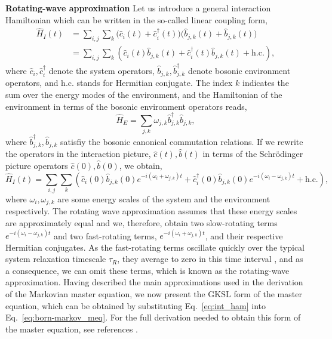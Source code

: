 \textbf{Rotating-wave approximation}
Let us introduce a general interaction Hamiltonian which can be written in the so-called linear coupling form, 
\begin{align}
    \hat{H}_I(t) &=  \sum_{i,j} \sum_{k}  \Big(\hat{c}_i(t) + \hat{c}^\dagger_i(t)\Big) \Big(\hat{b}_{j,k}(t) + \hat{b}_{j,k}(t)\Big)\\
    &= \sum_{i,j} \sum_{k} (\hat{c}_i(t) \hat{b}_{j,k}(t) + \hat{c}^\dagger_i(t) \hat{b}_{j,k}(t) + \text{h.c.}),
\end{align}
where $\hat{c}_i,\hat{c}^\dagger_i$ denote the system operators, $\hat{b}_{j,k},\hat{b}^\dagger_{j,k}$ denote bosonic environment operators, and h.c. stands for Hermitian conjugate. The index $k$ indicates the sum over the energy modes of the environment, and the Hamiltonian of the environment \cite{gardiner2004} in terms of the bosonic environment operators reads, 
\begin{equation}
    \hat{H}_E = \sum\limits_{j,k} \omega_{j,k} \hat{b}^\dagger_{j,k} \hat{b}_{j,k},
\end{equation}
where $\hat{b}^\dagger_{j,k}, \hat{b}_{j,k}$ satisfiy the bosonic canonical commutation relations.
If we rewrite the operators in the interaction picture, $\hat{c}(t), \hat{b}(t)$ in terms of the Schr\"{o}dinger picture operators $\hat{c}(0), \hat{b}(0)$, we obtain, 
\begin{equation}
\label{eq:int_ham}
    \hat{H}_I(t) = \sum_{i,j} \sum_{k} (\hat{c}_i(0) \hat{b}_{j,k}(0) e^{-i(\omega_i+\omega_{j,k})t} + \hat{c}^\dagger_i(0) \hat{b}_{j,k}(0) e^{-i(\omega_i-\omega_{j,k})t} + \text{h.c.}),
\end{equation}
where $\omega_i, \omega_{j,k}$ are some energy scales of the system and the environment respectively. The rotating wave approximation assumes that these energy scales are approximately equal and we, therefore, obtain two slow-rotating terms $e^{-i(\omega_i-\omega_{j,k})t}$ and two fast-rotating terms, $e^{-i(\omega_i+\omega_{j,k})t}$, and their respective Hermitian conjugates. As the fast-rotating terms oscillate quickly over the typical system relaxation timescale $\tau_R$, they average to zero in this time interval \cite{fujii2017}, and as a consequence, we can omit these terms, which is known as the rotating-wave approximation.
Having described the main approximations used in the derivation of the Markovian master equation, we now present the GKSL form of the master equation, which can be obtained by substituting Eq.~\ref{eq:int_ham} into Eq.~\ref{eq:born-markov_meq}. For the full derivation needed to obtain this form of the master equation, see references \cite{manzano2020}.

